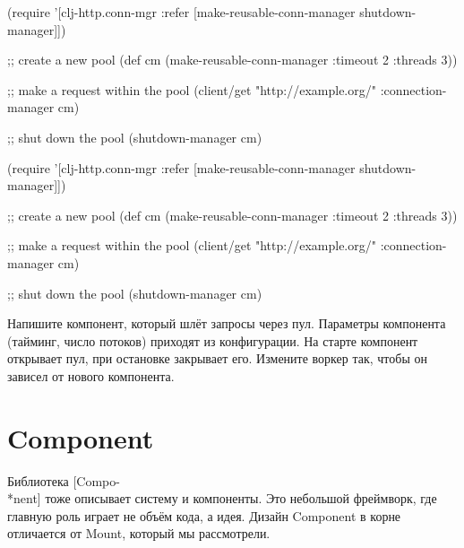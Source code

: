 \ifnarrow

\begin{english}
  \begin{clojure}
(require
 '[clj-http.conn-mgr :refer
   [make-reusable-conn-manager
    shutdown-manager]])

;; create a new pool
(def cm (make-reusable-conn-manager
         {:timeout 2 :threads 3}))

;; make a request within the pool
(client/get "http://example.org/"
            {:connection-manager cm})

;; shut down the pool
(shutdown-manager cm)
  \end{clojure}
\end{english}

\else

\begin{english}
  \begin{clojure}
(require
 '[clj-http.conn-mgr :refer
   [make-reusable-conn-manager
    shutdown-manager]])

;; create a new pool
(def cm (make-reusable-conn-manager
         {:timeout 2 :threads 3}))

;; make a request within the pool
(client/get "http://example.org/"
            {:connection-manager cm})

;; shut down the pool
(shutdown-manager cm)
  \end{clojure}
\end{english}

\fi


Напишите компонент, который шлёт запросы через пул. Параметры компонента
(тайминг, число потоков) приходят из конфигурации. На старте компонент открывает
пул, при остановке закрывает его. Измените воркер так, чтобы он зависел от
нового компонента.

\ifafive\vspace{10mm}\pagebreak[4]\fi

\section{Component}


Библиотека [Compo-\\*nent] тоже
описывает систему и компоненты. Это небольшой фреймворк, где главную роль играет
не объём кода, а идея. Дизайн Component в корне отличается от Mount, который мы
рассмотрели.

